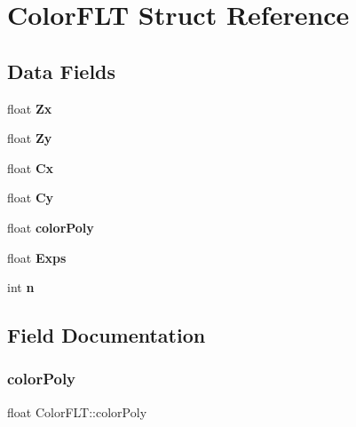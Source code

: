 \hypertarget{struct_color_f_l_t}{}\section{Color\+F\+LT Struct Reference}
\label{struct_color_f_l_t}
\subsection*{Data Fields}
\begin{DoxyCompactItemize}
\item 
\mbox{\label{struct_color_f_l_t_a70cc5d58d2522cdf732cf5d3756756f8}} 
float {\bfseries Zx}
\item 
\mbox{\label{struct_color_f_l_t_a644638d709023a61d56084c27e2f6f40}} 
float {\bfseries Zy}
\item 
\mbox{\label{struct_color_f_l_t_af4d84f668f31ebdd414ddb19d7e42f8a}} 
float {\bfseries Cx}
\item 
\mbox{\label{struct_color_f_l_t_a17d65d9420a8ed144559a9d3d591b680}} 
float {\bfseries Cy}
\item 
\mbox{\label{struct_color_f_l_t_a9ac4dfc637230f01cc278625e4c08f63}} 
float {\bfseries color\+Poly}
\item 
\mbox{\label{struct_color_f_l_t_a142bf1562c32e79af417a8258e764514}} 
float {\bfseries Exps}
\item 
\mbox{\label{struct_color_f_l_t_a43254e86f118bc92dd21f5a58013e7e4}} 
int {\bfseries n}
\end{DoxyCompactItemize}


\subsection{Field Documentation}
\mbox{\label{struct_color_f_l_t_a9ac4dfc637230f01cc278625e4c08f63}} 
\subsubsection{\texorpdfstring{color\+Poly}{colorPoly}}
{\footnotesize\ttfamily float Color\+F\+L\+T\+::color\+Poly}

